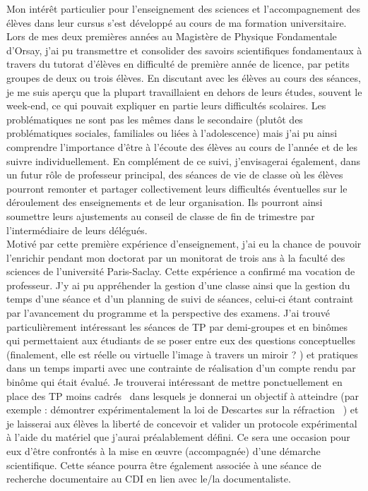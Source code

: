 Mon intérêt particulier pour l'enseignement des sciences et l'accompagnement des élèves dans leur cursus s'est développé au cours de ma formation universitaire. Lors de mes deux premières années au Magistère de Physique Fondamentale d'Orsay, j'ai pu transmettre et consolider des savoirs scientifiques fondamentaux à travers du tutorat d'élèves en difficulté de première année de licence, par petits groupes de deux ou trois élèves. En discutant avec les élèves au cours des séances, je me suis aperçu que la plupart travaillaient en dehors de leurs études, souvent le week-end, ce qui pouvait expliquer en partie leurs difficultés scolaires. Les problématiques ne sont pas les mêmes dans le secondaire (plutôt des problématiques sociales, familiales ou liées à l'adolescence) mais j'ai pu ainsi comprendre l'importance d'être à l'écoute des élèves au cours de l'année et de les suivre individuellement. En complément de ce suivi, j'envisagerai également, dans un futur rôle de professeur principal, des séances de vie de classe où les élèves pourront remonter et partager collectivement leurs difficultés éventuelles sur le déroulement des enseignements et de leur organisation. Ils pourront ainsi soumettre leurs ajustements au conseil de classe de fin de trimestre par l'intermédiaire de leurs délégués.\\

Motivé par cette première expérience d'enseignement, j'ai eu la chance de pouvoir l'enrichir pendant mon doctorat par un monitorat de trois ans à la faculté des sciences de l'université Paris-Saclay. Cette expérience a confirmé ma vocation de professeur. J'y ai pu appréhender la gestion d'une classe ainsi que la gestion du temps d'une séance et d'un planning de suivi de séances, celui-ci étant contraint par l'avancement du programme et la perspective des examens. J'ai trouvé particulièrement intéressant les séances de TP par demi-groupes et en binômes qui permettaient aux étudiants de se poser entre eux des questions conceptuelles (\og finalement, elle est réelle ou virtuelle l'image à travers un miroir ? \fg) et pratiques dans un temps imparti avec une contrainte de réalisation d'un compte rendu par binôme qui était évalué. Je trouverai intéressant de mettre ponctuellement en place des TP \og moins cadrés \fg ~dans lesquels je donnerai un objectif à atteindre (par exemple : \og démontrer expérimentalement la loi de Descartes sur la réfraction \fg ~) et je laisserai aux élèves la liberté de concevoir et valider un protocole expérimental à l'aide du matériel que j'aurai préalablement défini. Ce sera une occasion pour eux d'être confrontés à la mise en \oe uvre (accompagnée) d'une démarche scientifique. Cette séance pourra être également associée à une séance de recherche documentaire au CDI en lien avec le/la documentaliste.\\

